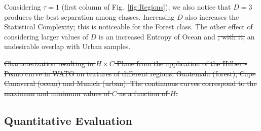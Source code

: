 \documentclass[journal]{IEEEtran}
\providecommand{\DIFaddtex}[1]{{\protect\color{blue}\uwave{#1}}} %
\providecommand{\DIFdeltex}[1]{{\protect\color{red}\sout{#1}}}                      %
\providecommand{\DIFaddbegin}{} %
\providecommand{\DIFaddend}{} %
\providecommand{\DIFdelbegin}{} %
\providecommand{\DIFdelend}{} %
\providecommand{\DIFadd}[1]{\texorpdfstring{\DIFaddtex{#1}}{#1}} %
\providecommand{\DIFdel}[1]{\texorpdfstring{\DIFdeltex{#1}}{}} %
\newcommand{\DIFscaledelfig}{0.5}
\newlength{\DIFdelgraphicswidth} %
\newlength{\DIFdelgraphicsheight} %
\newcommand{\DIFaddincludegraphics}[2][]{{\color{blue}\fbox{\DIFOincludegraphics[#1]{#2}}}} %
\newcommand{\DIFdelincludegraphics}[2][]{%
\sbox{\DIFdelgraphicsbox}{\DIFOincludegraphics[#1]{#2}}%
\settoboxwidth{\DIFdelgraphicswidth}{\DIFdelgraphicsbox} %
\settoboxtotalheight{\DIFdelgraphicsheight}{\DIFdelgraphicsbox} %
\scalebox{\DIFscaledelfig}{%
\parbox[b]{\DIFdelgraphicswidth}{\usebox{\DIFdelgraphicsbox}\\[-\baselineskip] \rule{\DIFdelgraphicswidth}{0em}}\llap{\resizebox{\DIFdelgraphicswidth}{\DIFdelgraphicsheight}{%
\setlength{\unitlength}{\DIFdelgraphicswidth}%
\begin{picture}(1,1)%
\thicklines\linethickness{2pt} %
{\color[rgb]{1,0,0}\put(0,0){\framebox(1,1){}}}%
{\color[rgb]{1,0,0}\put(0,0){\line( 1,1){1}}}%
{\color[rgb]{1,0,0}\put(0,1){\line(1,-1){1}}}%
\end{picture}%
}\hspace*{3pt}}} %
} %
\DeclareRobustCommand{\DIFaddbegin}{\DIFOaddbegin \let\includegraphics\DIFaddincludegraphics} %
\DeclareRobustCommand{\DIFaddend}{\DIFOaddend \let\includegraphics\DIFOincludegraphics} %
\DeclareRobustCommand{\DIFdelbegin}{\DIFOdelbegin \let\includegraphics\DIFdelincludegraphics} %
\DeclareRobustCommand{\DIFdelend}{\DIFOaddend \let\includegraphics\DIFOincludegraphics} %
\begin{document}
\DIFaddend Considering $\tau=1$ (first column of Fig.~\ref{fig:Regions}), 
we also notice that $D=3$ produces the best separation among classes.
Increasing $D$ also increases the Statistical Complexity; this is noticeable for the Forest class.
The other effect of considering larger values of \DIFdelbegin \DIFdel{$D$ }\DIFdelend \DIFaddbegin \DIFadd{$ D $ }\DIFaddend is an increased Entropy of Ocean and \DIFdelbegin \DIFdel{, with it, }\DIFdelend an undesirable overlap with Urban samples.

\DIFdelbegin %

{%
\DIFdel{Characterization resulting in $H \times C$ Plane from the application of the Hilbert-Peano curve in WATG on textures of different regions: Guatemala (forest), Cape Canaveral (ocean) and Munich (urban). 
		The continuous curves correspond to the maximum and minimum values of $C$ as a function of $H$.}}

\DIFdelend \subsection{Quantitative Evaluation}
\end{document}
